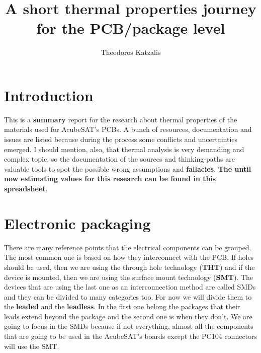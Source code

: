 \documentclass[final]{cubedoc}
\title{A short thermal properties journey for the PCB/package level} %
\author{Theodoros Katzalis}
\begin{document}
 
\section{Introduction}

This is a \textbf{summary} report for the research about thermal properties of the materials used for AcubeSAT's PCBs. A bunch of resources, documentation and issues are listed because during the process some conflicts and uncertainties emerged. I should mention, also, that thermal analysis is very demanding and complex topic, so the documentation of the sources and thinking-paths are valuable tools to spot the possible wrong assumptions and \textbf{fallacies}. \textbf{The until now estimating values for this research can be found in \href{https://drive.google.com/open?id=1gGPhBZe94Yt7D8FDdGNza4ZnG0pRfhT0xG7Z2tBdK7o}{this} spreadsheet}.





\section{Electronic packaging}

There are many reference points that the electrical components can be grouped. The most common one is based on how they interconnect with the PCB. If holes should be used, then we are using the through hole technology (\textbf{THT}) and if the device is mounted, then we are using the surface mount technology (\textbf{SMT}). The devices that are using the last one as an interconnection method are called SMDs and they can be divided to many categories too. For now we will divide them to the \textbf{leaded} and the \textbf{leadless}. In the first one belong the packages that their leads extend beyond the package and the second one is when they don't. We are going to focus in the SMDs because if not everything, almost all the components that are going to be used in the AcubeSAT's boards except the PC104 connectors will use the SMT. 
\end{document}
